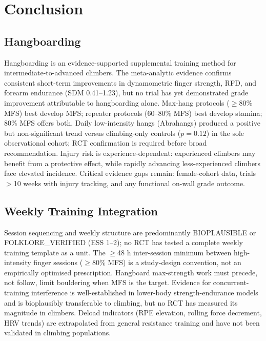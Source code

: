 \section{Conclusion}

\subsection*{Hangboarding}

Hangboarding is an evidence-supported supplemental training method for intermediate-to-advanced climbers. The meta-analytic evidence \cite{SO23} confirms consistent short-term improvements in dynamometric finger strength, RFD, and forearm endurance (SDM 0.41--1.23), but no trial has yet demonstrated grade improvement attributable to hangboarding alone. Max-hang protocols ($\geq$80\% MFS) best develop MFS; repeater protocols (60--80\% MFS) best develop stamina; 80\% MFS offers both. Daily low-intensity hangs (Abrahangs) produced a positive but non-significant trend versus climbing-only controls ($p = 0.12$) in the sole observational cohort; RCT confirmation is required before broad recommendation. Injury risk is experience-dependent: experienced climbers may benefit from a protective effect, while rapidly advancing less-experienced climbers face elevated incidence. Critical evidence gaps remain: female-cohort data, trials $>$10 weeks with injury tracking, and any functional on-wall grade outcome.

\subsection*{Weekly Training Integration}

Session sequencing and weekly structure are predominantly BIOPLAUSIBLE or FOLKLORE\_VERIFIED (ESS 1--2); no RCT has tested a complete weekly training template as a unit. The $\geq$48 h inter-session minimum between high-intensity finger sessions ($\geq$80\% MFS) is a study-design convention, not an empirically optimised prescription. Hangboard max-strength work must precede, not follow, limit bouldering when MFS is the target. Evidence for concurrent-training interference is well-established in lower-body strength-endurance models \cite{WMR+12} and is bioplausibly transferable to climbing, but no RCT has measured its magnitude in climbers. Deload indicators (RPE elevation, rolling force decrement, HRV trends) are extrapolated from general resistance training and have not been validated in climbing populations.

